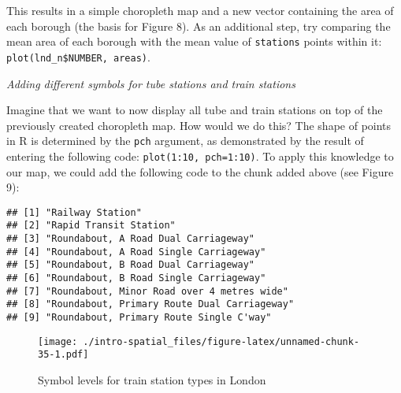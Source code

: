 \documentclass[]{article}
\newenvironment{Shaded}{}{}
\newcommand{\KeywordTok}[1]{\textcolor[rgb]{0.00,0.44,0.13}{\textbf{{#1}}}}
\newcommand{\DataTypeTok}[1]{\textcolor[rgb]{0.56,0.13,0.00}{{#1}}}
\newcommand{\StringTok}[1]{\textcolor[rgb]{0.25,0.44,0.63}{{#1}}}
\newcommand{\CommentTok}[1]{\textcolor[rgb]{0.38,0.63,0.69}{\textit{{#1}}}}
\newcommand{\NormalTok}[1]{{#1}}
\begin{document}
This results in a simple choropleth map and a new vector containing the
area of each borough (the basis for Figure 8). As an additional step,
try comparing the mean area of each borough with the mean value of
\texttt{stations} points within it:
\texttt{plot(lnd\_n\$NUMBER, areas)}.

\emph{Adding different symbols for tube stations and train stations}

Imagine that we want to now display all tube and train stations on top
of the previously created choropleth map. How would we do this? The
shape of points in R is determined by the \texttt{pch} argument, as
demonstrated by the result of entering the following code:
\texttt{plot(1:10, pch=1:10)}. To apply this knowledge to our map, we
could add the following code to the chunk added above (see Figure 9):

\begin{Shaded}
\end{Shaded}

\begin{verbatim}
## [1] "Railway Station"                           
## [2] "Rapid Transit Station"                     
## [3] "Roundabout, A Road Dual Carriageway"       
## [4] "Roundabout, A Road Single Carriageway"     
## [5] "Roundabout, B Road Dual Carriageway"       
## [6] "Roundabout, B Road Single Carriageway"     
## [7] "Roundabout, Minor Road over 4 metres wide" 
## [8] "Roundabout, Primary Route Dual Carriageway"
## [9] "Roundabout, Primary Route Single C'way"
\end{verbatim}

\begin{figure}[htbp]
\centering
\texttt{[image: ./intro-spatial\_files/figure-latex/unnamed-chunk-35-1.pdf]}
\caption{Symbol levels for train station types in London}
\end{figure}
\end{document}
